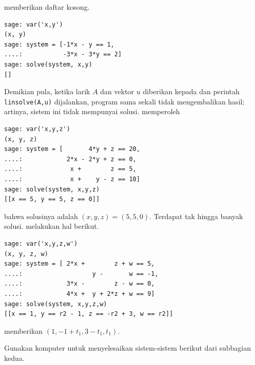 \begin{exercises}
\begin{answer}
\begin{exparts}
           \Sage{} memberikan daftar kosong.
\begin{lstlisting}
sage: var('x,y')
(x, y)
sage: system = [-1*x - y == 1,
....:           -3*x - 3*y == 2]
sage: solve(system, x,y)
[]          
\end{lstlisting}
           Demikian pula, 
           ketika larik $A$ dan vektor $u$ diberikan kepada \Maple{}
           dan perintah \lstinline!linsolve(A,u)! dijalankan, 
           program sama sekali tidak mengembalikan hasil; artinya,
           sistem ini tidak mempunyai solusi.
        \partsitem \Sage{} memperoleh 
\begin{lstlisting}
sage: var('x,y,z')
(x, y, z)
sage: system = [       4*y + z == 20,
....:            2*x - 2*y + z == 0,
....:             x +        z == 5,
....:             x +    y - z == 10]
sage: solve(system, x,y,z)
[[x == 5, y == 5, z == 0]]          
\end{lstlisting}
           bahwa solusinya adalah \( (x,y,z)=(5,5,0) \).
        \partsitem Terdapat tak hingga banyak solusi.
           \Sage{} melakukan hal berikut.
\begin{lstlisting}
sage: var('x,y,z,w')
(x, y, z, w)
sage: system = [ 2*x +        z + w == 5,
....:                   y -       w == -1,
....:            3*x -        z - w == 0,
....:            4*x +  y + 2*z + w == 9]
sage: solve(system, x,y,z,w)
[[x == 1, y == r2 - 1, z == -r2 + 3, w == r2]]          
\end{lstlisting}
           \Maple{} memberikan $(1, -1+t_1, 3-t_1, t_1)$.
      \end{exparts}
    \end{answer}
  \item 
    Gunakan komputer untuk menyelesaikan sistem-sistem berikut dari subbagian kedua.
\end{exercises}
